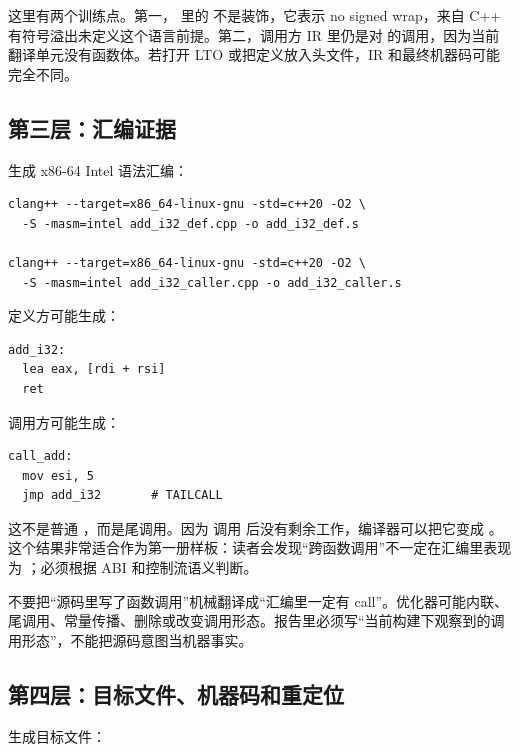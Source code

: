 这里有两个训练点。第一， 里的  不是装饰，它表示 no signed wrap，来自 C++ 有符号溢出未定义这个语言前提。第二，调用方 IR 里仍是对  的调用，因为当前翻译单元没有函数体。若打开 LTO 或把定义放入头文件，IR 和最终机器码可能完全不同。

\subsection{第三层：汇编证据}

生成 x86-64 Intel 语法汇编：

\begin{lstlisting}[numbers=none,caption={生成 x86-64 汇编}]
clang++ --target=x86_64-linux-gnu -std=c++20 -O2 \
  -S -masm=intel add_i32_def.cpp -o add_i32_def.s

clang++ --target=x86_64-linux-gnu -std=c++20 -O2 \
  -S -masm=intel add_i32_caller.cpp -o add_i32_caller.s
\end{lstlisting}

定义方可能生成：

\begin{lstlisting}[numbers=none,caption={add\_i32 的典型汇编}]
add_i32:
  lea eax, [rdi + rsi]
  ret
\end{lstlisting}

调用方可能生成：

\begin{lstlisting}[numbers=none,caption={call\_add 的典型汇编}]
call_add:
  mov esi, 5
  jmp add_i32       # TAILCALL
\end{lstlisting}

这不是普通 ，而是尾调用。因为  调用  后没有剩余工作，编译器可以把它变成 。这个结果非常适合作为第一册样板：读者会发现“跨函数调用”不一定在汇编里表现为 ；必须根据 ABI 和控制流语义判断。

\begin{warningbox}
不要把“源码里写了函数调用”机械翻译成“汇编里一定有 call”。优化器可能内联、尾调用、常量传播、删除或改变调用形态。报告里必须写“当前构建下观察到的调用形态”，不能把源码意图当机器事实。
\end{warningbox}

\subsection{第四层：目标文件、机器码和重定位}

生成目标文件：

